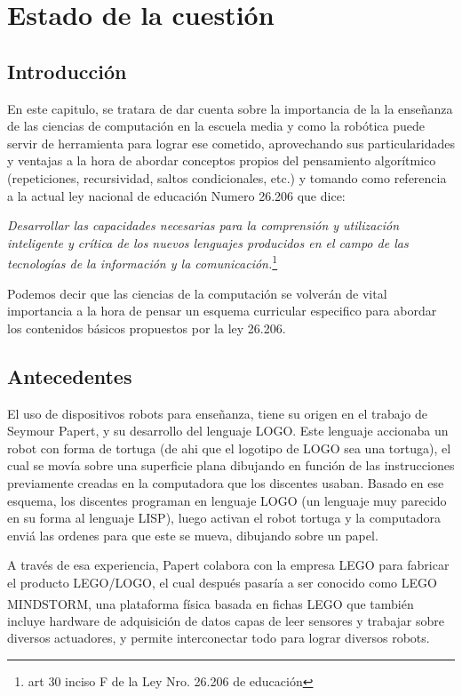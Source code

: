 \chapter{Estado de la cuestión}

\section{Introducción}

En este capitulo, se tratara de dar cuenta sobre la importancia de la la enseñanza de las ciencias de computación en la escuela media y como la robótica puede servir de herramienta para lograr ese cometido, aprovechando sus particularidades y ventajas a la hora de abordar conceptos propios del pensamiento algorítmico (repeticiones, recursividad, saltos condicionales, etc.) y tomando como referencia a la actual ley nacional de educación Numero 26.206 que dice: 

\textit{Desarrollar  las  capacidades  necesarias  para  la  comprensión  y  utilización  inteligente  y  crítica  de  los  nuevos  lenguajes  producidos  en  el  campo  de  las tecnologías de la información y la comunicación.}\footnote{art 30 inciso F de la Ley Nro. 26.206 de educación}

Podemos decir que las ciencias de la computación \citep[pág 4]{sadosky2013cc} se volverán de vital importancia a la hora de pensar un esquema curricular especifico para abordar los contenidos básicos propuestos por la ley 26.206.

\section{Antecedentes}

El uso de dispositivos robots para enseñanza, tiene su origen en el trabajo de Seymour Papert, y su desarrollo del lenguaje LOGO. Este lenguaje accionaba un robot con forma de tortuga (de ahi que el logotipo de LOGO sea una tortuga), el cual se movía sobre una superficie plana dibujando en función de las instrucciones previamente creadas en la computadora que los discentes usaban. Basado en ese esquema, los discentes programan en lenguaje LOGO (un lenguaje muy parecido en su forma al lenguaje LISP), luego activan el robot tortuga y la computadora enviá las ordenes para que este se mueva, dibujando sobre un papel. 

A través de esa experiencia, Papert colabora con la empresa LEGO para fabricar el producto LEGO/LOGO, el cual después pasaría a ser conocido como LEGO MINDSTORM\textsuperscript{\texttrademark}, una plataforma física basada en fichas LEGO\textsuperscript{\textregistered} que también incluye hardware de adquisición de datos capas de leer sensores y trabajar sobre diversos actuadores, y permite interconectar todo para lograr diversos robots.

